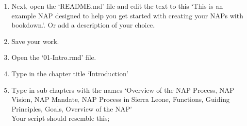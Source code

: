 \documentclass[
]{book}
\providecommand{\tightlist}{%
  \setlength{\itemsep}{0pt}\setlength{\parskip}{0pt}}
\begin{document}
\begin{enumerate}
\def\labelenumi{\arabic{enumi}.}
\setcounter{enumi}{17}
\tightlist
\item
  Next, open the `README.md' file and edit the text to this `This is an example NAP designed to help you get started with creating your NAPs with bookdown.'. Or add a description of your choice.
\item
  Save your work.\\
\item
  Open the `01-Intro.rmd' file.\\
\item
  Type in the chapter title `Introduction'\\
\item
  Type in sub-chapters with the names `Overview of the NAP Process, NAP Vision, NAP Mandate, NAP Process in Sierra Leone, Functions, Guiding Principles, Goals, Overview of the NAP'\\
  Your script should resemble this;
\end{enumerate}
\end{document}
